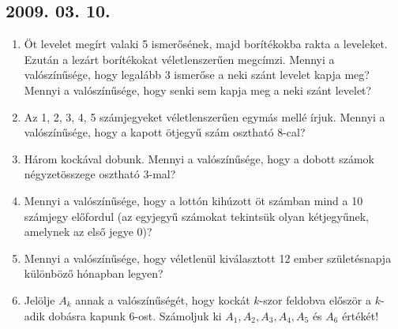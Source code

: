 \documentclass{article}
\begin{document}
\subsection*{2009. 03. 10.}
\begin{enumerate}
\item Öt levelet megírt valaki 5 ismerősének, majd borítékokba rakta a leveleket. Ezután a lezárt borítékokat véletlenszerűen megcímzi. Mennyi a valószínűsége, hogy legalább 3 ismerőse a neki szánt levelet kapja meg? Mennyi a valószínűsége, hogy senki sem kapja meg a neki szánt levelet? 

\item Az 1, 2, 3, 4, 5 számjegyeket véletlenszerűen egymás mellé írjuk. Mennyi a valószínűsége, hogy a kapott ötjegyű szám osztható 8-cal?

\item Három kockával dobunk. Mennyi a valószínűsége, hogy a dobott számok négyzetösszege osztható 3-mal?

\item Mennyi a valószínűsége, hogy a lottón kihúzott öt számban mind a 10 számjegy előfordul (az egyjegyű számokat tekintsük olyan kétjegyűnek, amelynek az első jegye 0)?

\item Mennyi a valószínűsége, hogy véletlenül kiválasztott 12 ember születésnapja különböző hónapban legyen?

\item Jelölje $A_k$ annak a valószínűségét, hogy kockát $k$-szor feldobva először a $k$-adik dobásra kapunk 6-ost. Számoljuk ki $A_1, A_2, A_3, A_4, A_5$ és $A_6$ értékét!
\end{enumerate}
\end{document}
